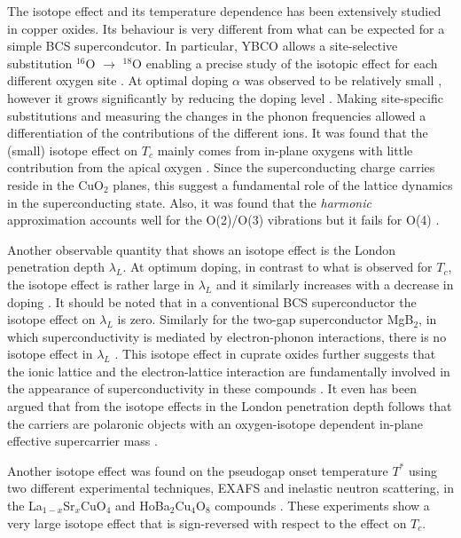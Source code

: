 The isotope effect and its temperature dependence has been extensively studied in copper oxides.
Its behaviour is very different from what can be expected for a simple BCS supercondcutor.
In particular, YBCO allows a site-selective substitution $^{16}$O $\rightarrow$ $^{18}$O enabling a precise study of the isotopic effect for each different oxygen site \cite{Conder1993,Cardona1988}. 
At optimal doping $\alpha$ was observed to be relatively small \cite{Thomsen1988}, however it grows significantly by reducing the doping level \cite{Bishop2007}.
Making site-specific substitutions and measuring the changes in the phonon frequencies  allowed a differentiation of the contributions of the different ions.
It was found that the (small) isotope effect on $T_c$ mainly comes from in-plane oxygens with little contribution from the apical oxygen  \cite{Ruani1994,Zech1994}.
Since the superconducting charge carries reside in the CuO$_2$ planes, this suggest a fundamental role of the lattice dynamics in the superconducting state.
Also, it was found that the \textit{harmonic} approximation accounts well for the O(2)/O(3) vibrations but it fails for O(4) \cite{Ruani1994}.

Another observable quantity that shows an isotope effect is the London penetration depth $\lambda_L$.
At optimum doping, in contrast to what is observed for $T_c$, the isotope effect is rather large in $\lambda_L$ and it similarly increases with a decrease in doping \cite{Zhao1997,Hofer2000,Khasanov2004}.
It should be noted that in a conventional BCS superconductor the isotope effect on $\lambda_L$ is zero.
Similarly for the two-gap superconductor MgB$_2$, in which superconductivity is mediated by electron-phonon interactions, there is no isotope effect in $\lambda_L$ \cite{Castro2004}.
This isotope effect in cuprate oxides further suggests that the ionic lattice and the electron-lattice interaction are fundamentally involved in the appearance of superconductivity in these compounds \cite{Kresin2009}.
It even has been argued that from the isotope effects in the London penetration depth follows that the carriers are polaronic objects with an oxygen-isotope dependent in-plane effective supercarrier mass \cite{Zhao1997,Hofer2000,Khasanov2004}.

Another isotope effect was found on the pseudogap onset temperature $T^*$ using two different experimental techniques, EXAFS and inelastic neutron scattering, in the La$_{1-x}$Sr$_x$CuO$_4$ and HoBa$_2$Cu$_4$O$_8$ compounds \cite{Lanzara1999,RubioTemprano2000}.
These experiments show a very large isotope effect that is sign-reversed with respect to the effect on $T_c$.

